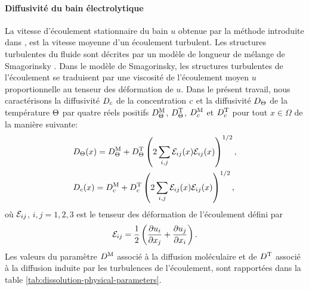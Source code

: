 \paragraph{Diffusivité du bain électrolytique} La vitesse d'écoulement
stationnaire du bain $u$ obtenue par la méthode introduite dans
\cite{Steiner2009}, \cite{Rochat2016} est la vitesse moyenne d'un
écoulement turbulent. Les structures turbulentes du fluide sont
décrites par un modèle de longueur de mélange de Smagorinsky
\cite{Rochat2016}. Dans le modèle de Smagorinsky, les structures
turbulentes de l'écoulement se traduisent par une viscosité de
l'écoulement moyen $u$ proportionnelle au tenseur des déformation de
$u$. Dans le présent travail, nous caractérisons la diffusivité
$D_{c}$ de la concentration $c$ et la
diffusivité $D_\Theta$ de la température $\Theta$ par
quatre réels positifs $D^{\mathrm M}_\Theta$, $D^{\mathrm T}_\Theta$,
$D^{\mathrm M}_c$ et $D^{\mathrm T}_c$ pour tout
$x\in\Omega$ de la manière suivante:
\begin{align}
  &D_\Theta(x) = D^{\mathrm M}_\Theta +
  D^{\mathrm T}_\Theta\left( 2\sum_{i,j}\mathcal E_{ij}(x)\mathcal E_{ij}(x) \right)^{1/2},\\
  &D_{c}(x) = D^{\mathrm M}_c +
  D^{\mathrm T}_c\left( 2\sum_{i,j}\mathcal E_{ij}(x)\mathcal E_{ij}(x) \right)^{1/2},
\end{align}
où $\mathcal E_{ij}$, $i, j = 1,2,3$ est le tenseur des déformation
de l'écoulement défini par
\begin{equation}
  \mathcal E_{ij} = \frac{1}{2}\left( \frac{\partial u_i}{\partial
      x_j} + \frac{\partial u_j}{\partial x_i} \right).
\end{equation}
Les valeurs du paramètre $D^{\mathrm M}$ associé à la diffusion
moléculaire et de $D^{\mathrm T}$ associé à la diffusion
induite par les turbulences de l'écoulement, sont rapportées dans la
table \ref{tab:dissolution-physical-parameters}.


